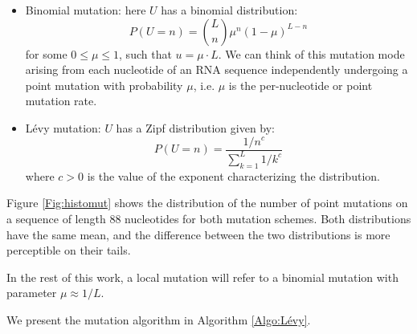 \begin{itemize}
	\item Binomial mutation: here $U$ has a binomial distribution: 
	$$
	P(U=n)= \binom{L}{n} \mu^n (1-\mu)^{L-n}
	$$
	for some $0 \leq \mu \leq 1$, such that $u=\mu \cdot L$. We can think of this mutation mode arising from each nucleotide of an RNA sequence independently undergoing a point mutation with probability $\mu$, i.e. $\mu$ is the per-nucleotide or point mutation rate. 
	
	\item Lévy mutation: $U$ has a Zipf distribution given by: 
	$$
	P(U=n)= \frac{1/n^c}{ \sum_{k=1}^{L}{1/k^c}}
	$$
	where $c>0$ is the value of the exponent characterizing the distribution.
\end{itemize}

Figure \ref{Fig:histomut} shows the distribution of the number of point mutations on a sequence of length $88$ nucleotides for both mutation schemes. Both distributions have the same mean, and the difference between the two distributions is more perceptible on their tails. 

In the rest of this work, a local mutation will refer to a binomial mutation with parameter $\mu \approx 1/L$.

We present the mutation algorithm in Algorithm \ref{Algo:Lévy}.

